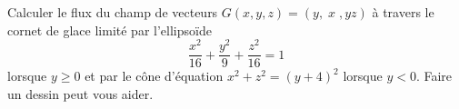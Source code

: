
\begin{exercice}\label{exoVariete0015}

 Calculer le flux du champ de vecteurs
$G(x,y,z) = (y, \; x\;, yz)$
à travers le cornet de glace  limité par l'ellipsoïde 
\begin{equation}
	\frac{x^2}{16}+\frac{y^2}{9}+\frac{z^2}{16}=1
\end{equation}
lorsque $y\geq0$ et par  le cône d'équation $ x^2+z^2=(y+4)^2  $ lorsque $y<0$. Faire un dessin peut vous aider.

\end{exercice}
